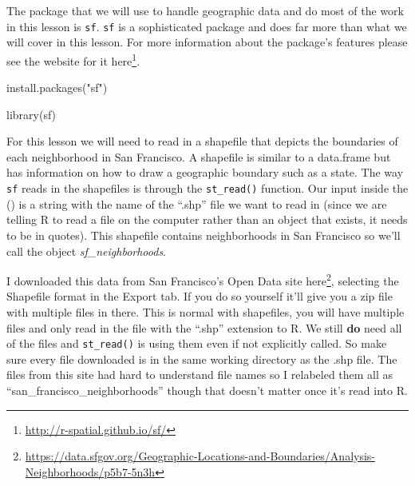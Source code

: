 \documentclass[
]{krantz}
\makeatletter
\newenvironment{Shaded}{\begin{snugshade}}{\end{snugshade}}
\newcommand{\FunctionTok}[1]{\textcolor[rgb]{0,0,0}{#1}}
\newcommand{\NormalTok}[1]{#1}
\newcommand{\StringTok}[1]{\textcolor[rgb]{0.5,0.5,0.5}{#1}}
\renewcommand{\href}[2]{#2\footnote{\url{#1}}}
\newenvironment{kframe}{%
\medskip{}
\setlength{\fboxsep}{.8em}
 \def\at@end@of@kframe{}%
 \ifinner\ifhmode%
  \def\at@end@of@kframe{\end{minipage}}%
  \begin{minipage}{\columnwidth}%
 \fi\fi%
 \def\FrameCommand##1{\hskip\@totalleftmargin \hskip-\fboxsep
 \colorbox{shadecolor}{##1}\hskip-\fboxsep
     \hskip-\linewidth \hskip-\@totalleftmargin \hskip\columnwidth}%
 \MakeFramed {\advance\hsize-\width
   \@totalleftmargin\z@ \linewidth\hsize
   \@setminipage}}%
 {\par\unskip\endMakeFramed%
 \at@end@of@kframe}
\renewenvironment{Shaded}{\begin{kframe}}{\end{kframe}}
\makeatother
\begin{document}
The package that we will use to handle geographic data and do most of the work in this lesson is \texttt{sf}. \texttt{sf} is a sophisticated package and does far more than what we will cover in this lesson. For more information about the package's features please see the website for it \href{http://r-spatial.github.io/sf/}{here}.

\begin{Shaded}
\begin{Highlighting}[]
\FunctionTok{install.packages}\NormalTok{(}\StringTok{"sf"}\NormalTok{)}
\end{Highlighting}
\end{Shaded}

\begin{Shaded}
\begin{Highlighting}[]
\FunctionTok{library}\NormalTok{(sf)}
\end{Highlighting}
\end{Shaded}

For this lesson we will need to read in a shapefile that depicts the boundaries of each neighborhood in San Francisco. A shapefile is similar to a data.frame but has information on how to draw a geographic boundary such as a state. The way \texttt{sf} reads in the shapefiles is through the \texttt{st\_read()} function. Our input inside the () is a string with the name of the ``.shp'' file we want to read in (since we are telling R to read a file on the computer rather than an object that exists, it needs to be in quotes). This shapefile contains neighborhoods in San Francisco so we'll call the object \emph{sf\_neighborhoods}.

I downloaded this data from San Francisco's Open Data site \href{https://data.sfgov.org/Geographic-Locations-and-Boundaries/Analysis-Neighborhoods/p5b7-5n3h}{here}, selecting the Shapefile format in the Export tab. If you do so yourself it'll give you a zip file with multiple files in there. This is normal with shapefiles, you will have multiple files and only read in the file with the ``.shp'' extension to R. We still \textbf{do} need all of the files and \texttt{st\_read()} is using them even if not explicitly called. So make sure every file downloaded is in the same working directory as the .shp file. The files from this site had hard to understand file names so I relabeled them all as ``san\_francisco\_neighborhoods'' though that doesn't matter once it's read into R.
\end{document}
